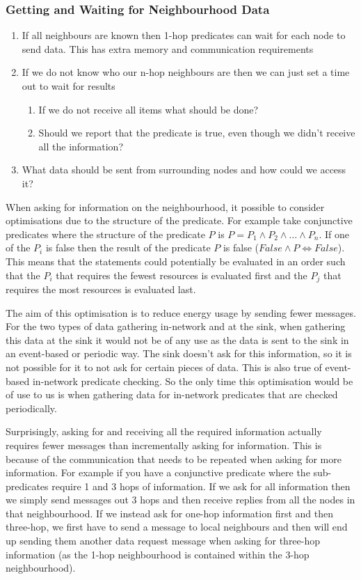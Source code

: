 \subsubsection{Getting and Waiting for Neighbourhood Data}

\begin{enumerate}
	\item If all neighbours are known then 1-hop predicates can wait for each node to send data. This has extra memory and communication requirements
	\item If we do not know who our n-hop neighbours are then we can just set a time out to wait for results
	\begin{enumerate}
		\item If we do not receive all items what should be done?
		\item Should we report that the predicate is true, even though we didn't receive all the information?
	\end{enumerate}
	\item What data should be sent from surrounding nodes and how could we access it?
\end{enumerate}


When asking for information on the neighbourhood, it possible to consider optimisations due to the structure of the predicate. For example take conjunctive predicates where the structure of the predicate $P$ is $P = P_1 \land P_2 \land \ldots \land P_n$. If one of the $P_i$ is false then the result of the predicate $P$ is false ($False \land P \Leftrightarrow False$). This means that the statements could potentially be evaluated in an order such that the $P_i$ that requires the fewest resources is evaluated first and the $P_j$ that requires the most resources is evaluated last.

The aim of this optimisation is to reduce energy usage by sending fewer messages. For the two types of data gathering in-network and at the sink, when gathering this data at the sink it would not be of any use as the data is sent to the sink in an event-based or periodic way. The sink doesn't ask for this information, so it is not possible for it to not ask for certain pieces of data. This is also true of event-based in-network predicate checking. So the only time this optimisation would be of use to us is when gathering data for in-network predicates that are checked periodically.

Surprisingly, asking for and receiving all the required information actually requires fewer messages than incrementally asking for information. This is because of the communication that needs to be repeated when asking for more information. For example if you have a conjunctive predicate where the sub-predicates require 1 and 3 hops of information. If we ask for all information then we simply send messages out 3 hops and then receive replies from all the nodes in that neighbourhood. If we instead ask for one-hop information first and then three-hop, we first have to send a message to local neighbours and then will end up sending them another data request message when asking for three-hop information (as the 1-hop neighbourhood is contained within the 3-hop neighbourhood).

